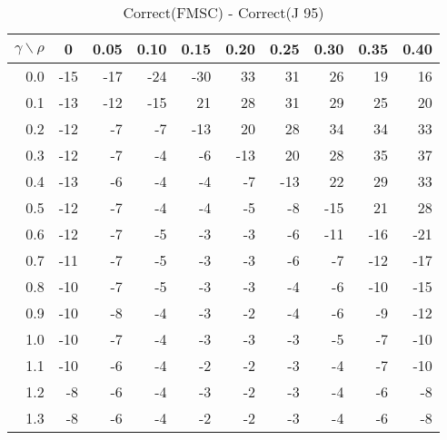 \documentclass[12pt]{article}
\begin{document}
%
\begin{table}[!tbp]
\caption{Correct(FMSC) - Correct(J 95)}
 \begin{center}
 \begin{tabular}{r|rrrrrrrrr}\hline\hline
\multicolumn{1}{c|}{$\gamma\backslash\rho$}&\multicolumn{1}{c}{0}&\multicolumn{1}{c}{0.05}&\multicolumn{1}{c}{0.10}&\multicolumn{1}{c}{0.15}&\multicolumn{1}{c}{0.20}&\multicolumn{1}{c}{0.25}&\multicolumn{1}{c}{0.30}&\multicolumn{1}{c}{0.35}&\multicolumn{1}{c}{0.40}\tabularnewline
\hline



0.0&-15&-17&-24&-30& 33& 31& 26& 19& 16\tabularnewline
0.1&-13&-12&-15& 21& 28& 31& 29& 25& 20\tabularnewline
0.2&-12& -7& -7&-13& 20& 28& 34& 34& 33\tabularnewline
0.3&-12& -7& -4& -6&-13& 20& 28& 35& 37\tabularnewline
0.4&-13& -6& -4& -4& -7&-13& 22& 29& 33\tabularnewline
0.5&-12& -7& -4& -4& -5& -8&-15& 21& 28\tabularnewline
0.6&-12& -7& -5& -3& -3& -6&-11&-16&-21\tabularnewline
0.7&-11& -7& -5& -3& -3& -6& -7&-12&-17\tabularnewline
0.8&-10& -7& -5& -3& -3& -4& -6&-10&-15\tabularnewline
0.9&-10& -8& -4& -3& -2& -4& -6& -9&-12\tabularnewline
1.0&-10& -7& -4& -3& -3& -3& -5& -7&-10\tabularnewline
1.1&-10& -6& -4& -2& -2& -3& -4& -7&-10\tabularnewline
1.2& -8& -6& -4& -3& -2& -3& -4& -6& -8\tabularnewline
1.3& -8& -6& -4& -2& -2& -3& -4& -6& -8\tabularnewline
\hline
\end{tabular}

\end{center}

\end{table}
\end{document}
